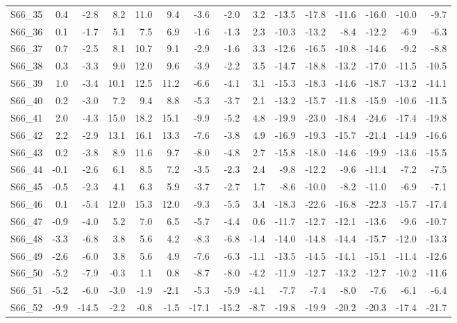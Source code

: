\begin{longtable}{lrrrrrrrrrrrrrr}
S66\_35 & 0.4 & -2.8 & 8.2 & 11.0 & 9.4 & -3.6 & -2.0 & 3.2 & -13.5 & -17.8 & -11.6 & -16.0 & -10.0 & -9.7 \\
S66\_36 & 0.1 & -1.7 & 5.1 & 7.5 & 6.9 & -1.6 & -1.3 & 2.3 & -10.3 & -13.2 & -8.4 & -12.2 & -6.9 & -6.3 \\
S66\_37 & 0.7 & -2.5 & 8.1 & 10.7 & 9.1 & -2.9 & -1.6 & 3.3 & -12.6 & -16.5 & -10.8 & -14.6 & -9.2 & -8.8 \\
S66\_38 & 0.3 & -3.3 & 9.0 & 12.0 & 9.6 & -3.9 & -2.2 & 3.5 & -14.7 & -18.8 & -13.2 & -17.0 & -11.5 & -10.5 \\
S66\_39 & 1.0 & -3.4 & 10.1 & 12.5 & 11.2 & -6.6 & -4.1 & 3.1 & -15.3 & -18.3 & -14.6 & -18.7 & -13.2 & -14.1 \\
S66\_40 & 0.2 & -3.0 & 7.2 & 9.4 & 8.8 & -5.3 & -3.7 & 2.1 & -13.2 & -15.7 & -11.8 & -15.9 & -10.6 & -11.5 \\
S66\_41 & 2.0 & -4.3 & 15.0 & 18.2 & 15.1 & -9.9 & -5.2 & 4.8 & -19.9 & -23.0 & -18.4 & -24.6 & -17.4 & -19.8 \\
S66\_42 & 2.2 & -2.9 & 13.1 & 16.1 & 13.3 & -7.6 & -3.8 & 4.9 & -16.9 & -19.3 & -15.7 & -21.4 & -14.9 & -16.6 \\
S66\_43 & 0.2 & -3.8 & 8.9 & 11.6 & 9.7 & -8.0 & -4.8 & 2.7 & -15.8 & -18.0 & -14.6 & -19.9 & -13.6 & -15.5 \\
S66\_44 & -0.1 & -2.6 & 6.1 & 8.5 & 7.2 & -3.5 & -2.3 & 2.4 & -9.8 & -12.2 & -9.6 & -11.4 & -7.2 & -7.5 \\
S66\_45 & -0.5 & -2.3 & 4.1 & 6.3 & 5.9 & -3.7 & -2.7 & 1.7 & -8.6 & -10.0 & -8.2 & -11.0 & -6.9 & -7.1 \\
S66\_46 & 0.1 & -5.4 & 12.0 & 15.3 & 12.0 & -9.3 & -5.5 & 3.4 & -18.3 & -22.6 & -16.8 & -22.3 & -15.7 & -17.4 \\
S66\_47 & -0.9 & -4.0 & 5.2 & 7.0 & 6.5 & -5.7 & -4.4 & 0.6 & -11.7 & -12.7 & -12.1 & -13.6 & -9.6 & -10.7 \\
S66\_48 & -3.3 & -6.8 & 3.8 & 5.6 & 4.2 & -8.3 & -6.8 & -1.4 & -14.0 & -14.8 & -14.4 & -15.7 & -12.0 & -13.3 \\
S66\_49 & -2.6 & -6.0 & 3.8 & 5.6 & 4.9 & -7.6 & -6.3 & -1.1 & -13.5 & -14.5 & -14.1 & -15.1 & -11.4 & -12.6 \\
S66\_50 & -5.2 & -7.9 & -0.3 & 1.1 & 0.8 & -8.7 & -8.0 & -4.2 & -11.9 & -12.7 & -13.2 & -12.7 & -10.2 & -11.6 \\
S66\_51 & -5.2 & -6.0 & -3.0 & -1.9 & -2.1 & -5.3 & -5.9 & -4.1 & -7.7 & -7.4 & -8.0 & -7.6 & -6.1 & -6.4 \\
S66\_52 & -9.9 & -14.5 & -2.2 & -0.8 & -1.5 & -17.1 & -15.2 & -8.7 & -19.8 & -19.9 & -20.2 & -20.3 & -17.4 & -21.7 \\

\end{longtable}
